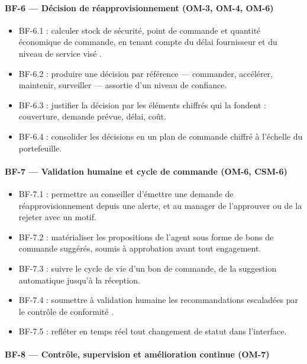 \paragraph{BF-6 — Décision de réapprovisionnement \textnormal{(OM-3, OM-4, OM-6)}}

\begin{itemize}[label=--]
    \item BF-6.1 : calculer stock de sécurité, point de commande et quantité économique de commande, en tenant compte du délai fournisseur et du niveau de service visé \cite{silver2016inventory,harris1913eoq}.
    \item BF-6.2 : produire une décision par référence — commander, accélérer, maintenir, surveiller — assortie d'un niveau de confiance.
    \item BF-6.3 : justifier la décision par les éléments chiffrés qui la fondent : couverture, demande prévue, délai, coût.
    \item BF-6.4 : consolider les décisions en un plan de commande chiffré à l'échelle du portefeuille.
\end{itemize}

\paragraph{BF-7 — Validation humaine et cycle de commande \textnormal{(OM-6, CSM-6)}}

\begin{itemize}[label=--]
    \item BF-7.1 : permettre au conseiller d'émettre une demande de réapprovisionnement depuis une alerte, et au manager de l'approuver ou de la rejeter avec un motif.
    \item BF-7.2 : matérialiser les propositions de l'agent sous forme de bons de commande suggérés, soumis à approbation avant tout engagement.
    \item BF-7.3 : suivre le cycle de vie d'un bon de commande, de la suggestion automatique jusqu'à la réception.
    \item BF-7.4 : soumettre à validation humaine les recommandations escaladées par le contrôle de conformité \cite{mosqueira2023human}.
    \item BF-7.5 : refléter en temps réel tout changement de statut dans l'interface.
\end{itemize}

\paragraph{BF-8 — Contrôle, supervision et amélioration continue \textnormal{(OM-7)}}

